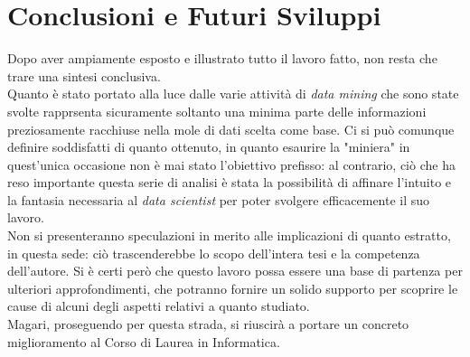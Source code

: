 \chapter{Conclusioni e Futuri Sviluppi}
\label{ch:fine}

Dopo aver ampiamente esposto e illustrato tutto il lavoro fatto, non resta che trare una sintesi conclusiva. \\

Quanto è stato portato alla luce dalle varie attività di \textit{data mining} che sono state svolte rapprsenta sicuramente soltanto una minima parte delle informazioni preziosamente racchiuse nella mole di dati scelta come base. Ci si può comunque definire soddisfatti di quanto ottenuto, in quanto esaurire la "miniera" in quest'unica occasione non è mai stato l'obiettivo prefisso: al contrario, ciò che ha reso importante questa serie di analisi è stata la possibilità di affinare l'intuito e la fantasia necessaria al \textit{data scientist} per poter svolgere efficacemente il suo lavoro.\\

Non si presenteranno speculazioni in merito alle implicazioni di quanto estratto, in questa sede: ciò trascenderebbe lo scopo dell'intera tesi e la competenza dell'autore. Si è certi però che questo lavoro possa essere una base di partenza per ulteriori approfondimenti, che potranno fornire un solido supporto per scoprire le cause di alcuni degli aspetti relativi a quanto studiato. \\

Magari, proseguendo per questa strada, si riuscirà a portare un concreto miglioramento al Corso di Laurea in Informatica.